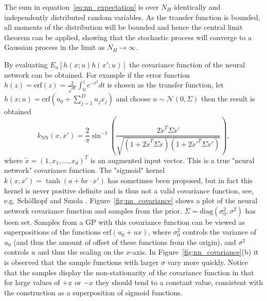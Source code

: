 \documentclass[11pt]{book}
\begin{document}
The sum in equation~\eqref{eq:nn_expectation} is over $N_H$ identically and independently distributed random variables. As the transfer function is bounded, all moments of the distribution will be bounded and hence the central limit theorem can be applied, showing that the stochastic process will converge to a Gaussian process in the limit as $N_H \to \infty$.

By evaluating $E_u[h(x; u) h(x'; u)]$ the covariance function of the neural network can be obtained. For example if the error function $h(z) = \text{erf}(z) = \frac{2}{\sqrt{\pi}} \int_0^z e^{-t^2} dt$ is chosen as the transfer function, let $h(x; u) = \text{erf}(u_0 + \sum_{j=1}^D u_j x_j)$ and choose $u \sim \mathcal{N}(0, \Sigma)$ then the result is obtained \cite{williams1998}
\begin{equation}
\label{eq:nn_covariance}
k_{\text{NN}}(x, x') = \frac{2}{\pi} \sin^{-1}\left(\frac{2\tilde{x}^T \Sigma \tilde{x}'}{\sqrt{(1 + 2\tilde{x}^T \Sigma \tilde{x})(1 + 2\tilde{x}'^T \Sigma \tilde{x}')}}\right),
\end{equation}
where $\tilde{x} = (1, x_1, \ldots, x_d)^T$ is an augmented input vector. This is a true "neural network" covariance function. The "sigmoid" kernel $k(x, x') = \tanh(a + b x \cdot x')$ has sometimes been proposed, but in fact this kernel is never positive definite and is thus not a valid covariance function, see, e.g. Schölkopf and Smola \cite{scholkopf2002}. Figure~\ref{fig:nn_covariance} shows a plot of the neural network covariance function and samples from the prior. $\Sigma = \text{diag}(\sigma_0^2, \sigma^2)$ has been set. Samples from a GP with this covariance function can be viewed as superpositions of the functions $\text{erf}(u_0 + ux)$, where $\sigma_0^2$ controls the variance of $u_0$ (and thus the amount of offset of these functions from the origin), and $\sigma^2$ controls $u$ and thus the scaling on the $x$-axis. In Figure~\ref{fig:nn_covariance}(b) it is observed that the sample functions with larger $\sigma$ vary more quickly. Notice that the samples display the non-stationarity of the covariance function in that for large values of $+x$ or $-x$ they should tend to a constant value, consistent with the construction as a superposition of sigmoid functions.
\end{document}

